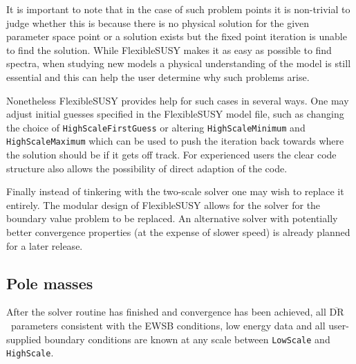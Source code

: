 \documentclass[final,3p,11pt,pdflatex]{elsarticle}
\makeatletter
\newcommand{\fs}{FlexibleSUSY\@\xspace}
\newcommand{\code}[1]{\lstinline|#1|}  %
\newcommand{\textoverline}[1]{$\overline{\mbox{#1}}$}
\newcommand{\DRbar}{\textoverline{DR}\xspace}
\makeatother
\begin{document}
It is important to note that in the case of such problem points it is
non-trivial to judge whether this is because there is no physical
solution for the given parameter space point or a solution
exists but the fixed point iteration is unable to find the solution.
While \fs makes it as easy as possible to find spectra, when studying
new models a physical understanding of the model is still essential
and this can help the user determine why such problems arise.

Nonetheless \fs provides help for such cases in several ways. One may
adjust initial guesses specified in the \fs model file, such
as changing the choice of \code{HighScaleFirstGuess} or altering
\code{HighScaleMinimum} and \code{HighScaleMaximum} which can be used
to push the iteration back towards where the solution should be if it
gets off track. For experienced users the clear code structure also allows the
possibility of direct adaption of the code. 

Finally instead of tinkering with the two-scale solver one may wish to
replace it entirely. The modular design of \fs allows for the
solver for the boundary value problem to be replaced. An alternative
solver with potentially better convergence properties (at the expense of slower
speed) is already planned for a later release.

\subsection{Pole masses}
\label{sec:PoleMasses}
After the solver routine has finished and convergence has been
achieved, all \DRbar\ parameters consistent with the EWSB conditions,
low energy data and all user-supplied boundary conditions are
known at any scale between \code{LowScale} and \code{HighScale}.
\end{document}
